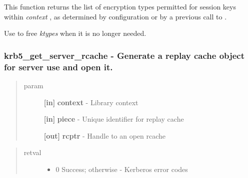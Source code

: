 \documentclass[letterpaper,10pt,english]{sphinxmanual}
\begin{document}
This function returns the list of encryption types permitted for session keys within \emph{context} , as determined by configuration or by a previous call to {\hyperref[appdev/refs/api/krb5_set_default_tgs_enctypes:krb5_set_default_tgs_enctypes]{}} .

Use {\hyperref[appdev/refs/api/krb5_free_enctypes:krb5_free_enctypes]{}} to free \emph{ktypes} when it is no longer needed.


\subsubsection{krb5\_get\_server\_rcache -  Generate a replay cache object for server use and open it.}
\label{appdev/refs/api/krb5_get_server_rcache:krb5-get-server-rcache-generate-a-replay-cache-object-for-server-use-and-open-it}\label{appdev/refs/api/krb5_get_server_rcache::doc}

\begin{fulllineitems}
\label{appdev/refs/api/krb5_get_server_rcache:krb5_get_server_rcache}
\end{fulllineitems}

\begin{quote}\begin{description}
\item[{param}] \leavevmode
\textbf{{[}in{]}} \textbf{context} - Library context

\textbf{{[}in{]}} \textbf{piece} - Unique identifier for replay cache

\textbf{{[}out{]}} \textbf{rcptr} - Handle to an open rcache

\end{description}\end{quote}
\begin{quote}\begin{description}
\item[{retval}] \leavevmode\begin{itemize}
\item {} 
0   Success; otherwise - Kerberos error codes

\end{itemize}

\end{description}\end{quote}
\end{document}
